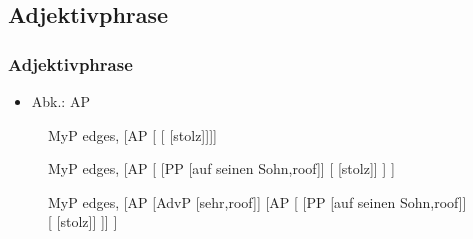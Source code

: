 \subsection{Adjektivphrase}

\begin{frame}
\frametitle{Adjektivphrase}

\begin{itemize}
	\item Abk.: AP
\end{itemize}

\begin{figure}[b]
	\begin{minipage}[b]{0.18\textwidth}
	\centering
	\footnotesize{
		\begin{forest}
		MyP edges,
		[AP [ [ [stolz]]]]
		\end{forest}
		}
  	\end{minipage}  
  	\pause            
	\begin{minipage}[b]{0.03\textwidth}
	\hfill
  	\end{minipage}
  	\begin{minipage}[b]{0.30\textwidth}
	\centering
	\footnotesize{
		\begin{forest}
		MyP edges,
		[AP [	[PP [auf seinen Sohn,roof]]
						[\zerobar{A} [stolz]]
			]
		]			 
		\end{forest}
		}
  	\end{minipage}  
	\begin{minipage}[b]{0.03\textwidth}
	\hfill
  	\end{minipage}
  	\pause            
	\begin{minipage}[b]{0.41\textwidth}
	\centering
	\footnotesize{
		\begin{forest}
		MyP edges,
		[AP [AdvP [sehr,roof]]
			[AP 
		    [	[PP [auf seinen Sohn,roof]]				
		    			[ [stolz]]
			]]
		]			 
		\end{forest}
		}
  	\end{minipage}
\end{figure}
\end{frame}



